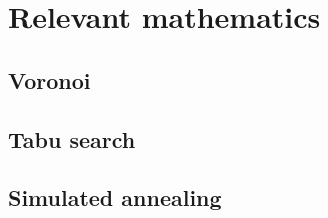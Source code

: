 \section{Relevant mathematics}\label{sec:relevantmath}
\subsection{Voronoi}
\subsection{Tabu search}
\subsection{Simulated annealing}